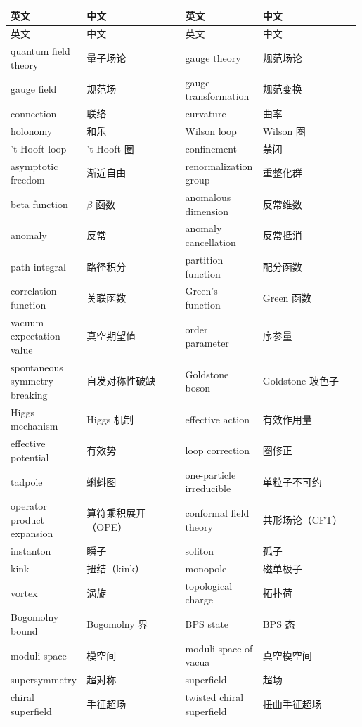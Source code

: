 \begin{longtable}{@{}p{0.215\linewidth}p{0.28\linewidth}p{0.215\linewidth}p{0.28\linewidth}@{}}
\toprule
英文 & 中文 & 英文 & 中文 \\
\midrule
\endfirsthead
\toprule
英文 & 中文 & 英文 & 中文 \\
\midrule
\endhead
\bottomrule
\endfoot
quantum field theory & 量子场论 & gauge theory & 规范场论 \\
gauge field & 规范场 & gauge transformation & 规范变换 \\
connection & 联络 & curvature & 曲率 \\
holonomy & 和乐 & Wilson loop & Wilson 圈 \\
't Hooft loop & 't Hooft 圈 & confinement & 禁闭 \\
asymptotic freedom & 渐近自由 & renormalization group & 重整化群 \\
beta function & $\beta$ 函数 & anomalous dimension & 反常维数 \\
anomaly & 反常 & anomaly cancellation & 反常抵消 \\
path integral & 路径积分 & partition function & 配分函数 \\
correlation function & 关联函数 & Green's function & Green 函数 \\
vacuum expectation value & 真空期望值 & order parameter & 序参量 \\
spontaneous symmetry breaking & 自发对称性破缺 & Goldstone boson & Goldstone 玻色子 \\
Higgs mechanism & Higgs 机制 & effective action & 有效作用量 \\
effective potential & 有效势 & loop correction & 圈修正 \\
tadpole & 蝌蚪图 & one-particle irreducible & 单粒子不可约 \\
operator product expansion & 算符乘积展开（OPE） & conformal field theory & 共形场论（CFT） \\
instanton & 瞬子 & soliton & 孤子 \\
kink & 扭结（kink） & monopole & 磁单极子 \\
vortex & 涡旋 & topological charge & 拓扑荷 \\
Bogomolny bound & Bogomolny 界 & BPS state & BPS 态 \\
moduli space & 模空间 & moduli space of vacua & 真空模空间 \\
supersymmetry & 超对称 & superfield & 超场 \\
chiral superfield & 手征超场 & twisted chiral superfield & 扭曲手征超场 \\

\end{longtable}
